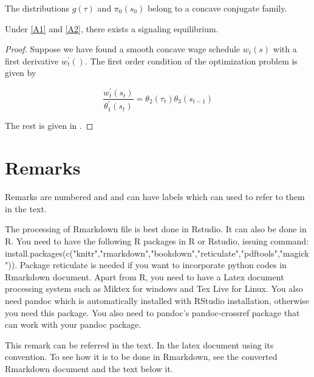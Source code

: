 \documentclass[12pt,svgnames]{article}
\begin{document}
\begin{assumption}
\label{A2}The distributions $g\left( \tau \right)$ and $\pi _{0}\left( s_{0}\right)$ belong to a concave conjugate family.
\end{assumption}

\begin{theorem}
Under \autoref{A1} and \autoref{A2}, there exists a signaling equilibrium.
\end{theorem}

\begin{proof}
Suppose we have found a smooth concave wage schedule $w_{t}\left( s\right)$
with a first derivative $w_{t}^{\prime }\left( {}\right)$. The first order
condition of the optimization problem is given by 

\begin{equation}
 \frac{w_{t}^{\prime }\left( s_{t}\right) }{\theta _{1}^{\prime }\left( s_{t}\right) }=
 \theta _{2}\left( \tau _{t}\right) \theta _{3}\left( s_{t-1}\right) \label{eq10}
\end{equation}

The rest is given in \cite{Raut_2017a}.

\end{proof}

\section{Remarks} \label{sec8}

Remarks are numbered and and can have labels which can used to refer to them in the text.


\begin{remark}
The processing of Rmarkdown file is best done in Rstudio. It can also be done in R. You need to have the following R packages in R or Rstudio, issuing command: install.packages(c("knitr","rmarkdown","bookdown","reticulate","pdftools","magick")). Package reticulate is needed if you want to incorporate python codes in Rmarkdown document. Apart from R, you need to have a Latex document processing system such as Miktex for windows and Tex Live for Linux.  You also need pandoc which is automatically installed with RStudio installation, otherwise you need this package. You also need to pandoc's pandoc-crossref package that can work with your pandoc package.  
\end{remark}


\begin{remark}
\label{re10}This remark can be referred in the text. In the latex document using its convention. 
To see how it is to be done in Rmarkdown, see the converted Rmarkdown document and the text below it.
\end{remark}
\end{document}
